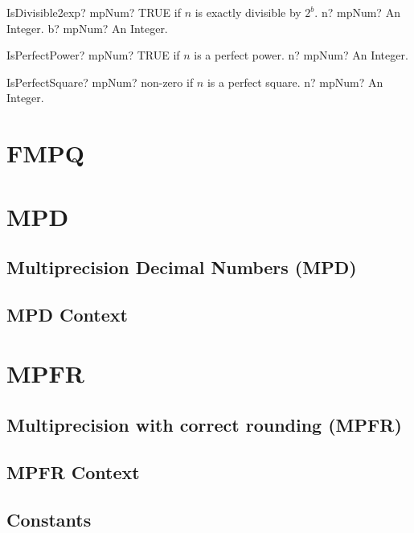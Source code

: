 \documentclass[12pt,a4paper,openany]{book}
\begin{document}
\begin{mpFunctionsExtract}
\mpFunctionTwo
{IsDivisible2exp? mpNum? TRUE if $n$ is exactly divisible by $2^b$.}
{n? mpNum? An Integer.}
{b? mpNum? An Integer.}
\end{mpFunctionsExtract}

\begin{mpFunctionsExtract}
\mpFunctionOne
{IsPerfectPower? mpNum? TRUE if $n$ is a perfect power.}
{n? mpNum? An Integer.}
\end{mpFunctionsExtract}

\begin{mpFunctionsExtract}
\mpFunctionOne
{IsPerfectSquare? mpNum? non-zero if $n$ is a perfect square.}
{n? mpNum? An Integer.}
\end{mpFunctionsExtract}

\chapter{FMPQ}

\chapter{MPD}

\section{Multiprecision Decimal Numbers (MPD)}

\section{MPD Context}

\chapter{MPFR}

\section{Multiprecision with correct rounding (MPFR)}

\section{MPFR Context}

\section{Constants}
\end{document}
